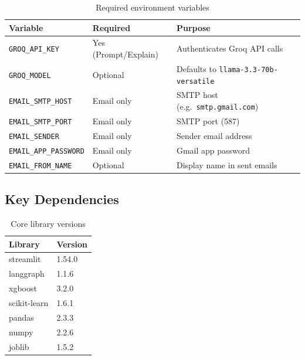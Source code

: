 \documentclass[12pt,a4paper]{article}
\begin{document}
\begin{table}[H]
\centering
\caption{Required environment variables}
\begin{tabularx}{\linewidth}{llX}
\toprule
\textbf{Variable} & \textbf{Required} & \textbf{Purpose} \\
\midrule
\texttt{GROQ\_API\_KEY}       & Yes (Prompt/Explain) & Authenticates Groq API calls \\
\texttt{GROQ\_MODEL}          & Optional             & Defaults to \texttt{llama-3.3-70b-versatile} \\
\texttt{EMAIL\_SMTP\_HOST}    & Email only           & SMTP host (e.g.\ \texttt{smtp.gmail.com}) \\
\texttt{EMAIL\_SMTP\_PORT}    & Email only           & SMTP port (587) \\
\texttt{EMAIL\_SENDER}        & Email only           & Sender email address \\
\texttt{EMAIL\_APP\_PASSWORD} & Email only           & Gmail app password \\
\texttt{EMAIL\_FROM\_NAME}    & Optional             & Display name in sent emails \\
\bottomrule
\end{tabularx}
\end{table}

\subsection{Key Dependencies}

\begin{table}[H]
\centering
\caption{Core library versions}
\begin{tabular}{ll}
\toprule
\textbf{Library} & \textbf{Version} \\
\midrule
streamlit     & 1.54.0 \\
langgraph     & 1.1.6 \\
xgboost       & 3.2.0 \\
scikit-learn  & 1.6.1 \\
pandas        & 2.3.3 \\
numpy         & 2.2.6 \\
joblib        & 1.5.2 \\
\bottomrule
\end{tabular}
\end{table}

\end{document}
